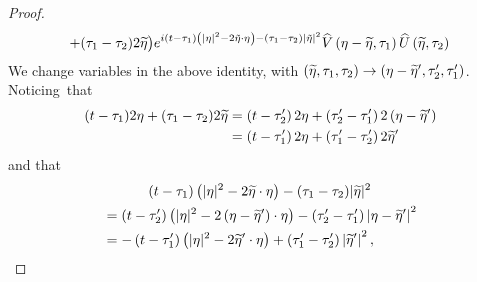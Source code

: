 \documentclass[AHL, Unicode, longabstracts,published]{cedram}
\let\oldtilde\tilde
\renewcommand*{\tilde}[1]{\mathchoice{\widetilde{#1}}{\widetilde{#1}}{\oldtilde{#1}}{\oldtilde{#1}}}
\let\oldhat\hat
\renewcommand*{\hat}[1]{\mathchoice{\widehat{#1}}{\widehat{#1}}{\oldhat{#1}}{\oldhat{#1}}}
\begin{document}
\begin{proof}
\begin{multline*}
+ (\tau_1-\tau_2) 2\tilde{\eta}\big) e^{i(t-\tau_1)\left(|\eta|^2-2\tilde{\eta}\cdot \eta\right)-(\tau_1-\tau_2)|\tilde{\eta}|^2 }\hat V\left(\eta-\tilde{\eta},\tau_1\right) \hat U\left(\tilde{\eta},\tau_2\right)
\end{multline*}
We change variables in the above identity, with $(\tilde \eta,\tau_1,\tau_2) \rightarrow (\eta-\tilde \eta',\tau_2',\tau_1')$. Noticing~that
\begin{equation} \label{id:changeofvarinter1}
\begin{split}
(t-\tau_1)2\eta + (\tau_1-\tau_2) 2\tilde{\eta} &=\left(t-\tau_2'\right)2\eta + \left(\tau_2'-\tau_1'\right) 2\left(\eta-\tilde{\eta}'\right)\\
&=\left(t-\tau_1'\right)2\eta + \left(\tau_1'-\tau_2'\right) 2\tilde{\eta}'
\end{split}
\end{equation}
and that
\begin{multline}\label{id:changeofvarinter2}
(t-\tau_1)\left(|\eta|^2-2\tilde{\eta}\cdot \eta\right)-(\tau_1-\tau_2)|\tilde{\eta}|^2\\
\begin{aligned}
&=\left(t-\tau_2'\right)\left(|\eta|^2-2\left(\eta-\tilde{\eta}'\right)\cdot \eta\right)-\left(\tau_2'-\tau_1'\right)\left|\eta-\tilde{\eta}'\right|^2\\
&=-\left(t-\tau_1'\right)\left(|\eta|^2-2\tilde{\eta}'\cdot \eta\right)+\left(\tau_1'-\tau_2'\right)\left|\tilde{\eta}'\right|^2,
\end{aligned}
\end{multline}


\end{proof}
\end{document}
